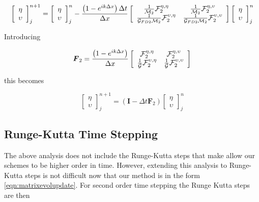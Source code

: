 \begin{equation*}
\left[\begin{array}{c}
\eta \\ \upsilon
\end{array}\right]^{n+1}_j = \left[\begin{array}{c}
\eta \\ \upsilon
\end{array}\right]^{n}_j - \frac{\left(1 - e^{ik\Delta x}\right) \Delta t}{\Delta x}\left[\begin{array}{c c}
\frac{1}{\mathcal{M}_2} \mathcal{F}_2^{\eta,\eta} & \frac{1}{\mathcal{M}_2}\mathcal{F}_2^{\eta,\upsilon} \\ \frac{1}{\mathcal{G}_{FD2} \mathcal{M}_2}\mathcal{F}_2^{\upsilon,\eta} & \frac{1}{\mathcal{G}_{FD2} \mathcal{M}_2}\mathcal{F}_2^{\upsilon,\upsilon} 
\end{array}\right]\left[\begin{array}{c}
\eta \\ \upsilon
\end{array}\right]^{n}_j
\end{equation*}

Introducing 

\[\boldsymbol{F}_2 = \frac{\left(1 - e^{ik\Delta x}\right)}{\Delta x}\left[\begin{array}{c c}
\mathcal{F}_2^{\eta,\eta} & \mathcal{F}_2^{\eta,\upsilon} \\ \frac{1}{\mathcal{G}}\mathcal{F}_2^{\upsilon,\eta} &  \frac{1}{\mathcal{G}}\mathcal{F}_2^{\upsilon,\upsilon} 
\end{array}\right] \]

this becomes

\begin{equation*}
\label{eqn:matrixevolupdate}
\left[\begin{array}{c}
\eta \\ \upsilon
\end{array}\right]^{n+1}_j = \left(\boldsymbol{I}  - \Delta t \boldsymbol{F}_2 \right) \left[\begin{array}{c}
\eta \\ \upsilon
\end{array}\right]^{n}_j
\end{equation*}

\subsection{Runge-Kutta Time Stepping}
The above analysis does not include the Runge-Kutta steps that make allow our schemes to be higher order in time. However, extending this analysis to Runge-Kutta steps is not difficult now that our method is in the form \eqref{eqn:matrixevolupdate}. For second order time stepping the Runge Kutta steps are then

